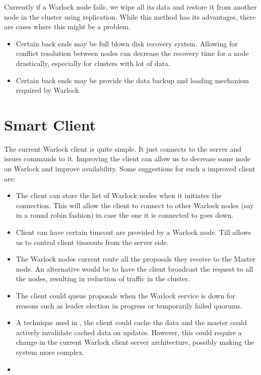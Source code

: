 Currently if a Warlock node fails, we wipe all its data and restore it from
another node in the cluster using replication. While this method has its
advantages, there are cases where this might be a problem.

\begin{itemize}
  \item Certain back ends may be full blown disk recovery system. Allowing for
    conflict resolution between nodes can decrease the recovery time for a
    node drastically, especially for clusters with lot of data.
  \item Certain back ends may be provide the data backup and loading mechanism
    required by Warlock.
\end{itemize}

\section{Smart Client}

The current Warlock client is quite simple. It just connects to the server and
issues commands to it. Improving the client can allow us to decrease some
node on Warlock and improve availability. Some suggestions for such a improved
client are:

\begin{itemize}
  \item The client can store the list of Warlock nodes when it initiates the
    connection. This will allow the client to connect to other Warlock nodes
    (say in a round robin fashion) in case the one it is connected to goes down.
  \item Client can have certain timeout are provided by a Warlock node. Till
    allows us to control client timeouts from the server side.
  \item The Warlock nodes current route all the proposals they receive to the
    Master node. An alternative would be to have the client broadcast the
    request to all the nodes, resulting in reduction of traffic in the cluster.
  \item The client could queue proposals when the Warlock service is down for
    reasons such as leader election in progress or temporarily failed quorums.
  \item A technique used in \citet{Burrows06}, the client could cache the data
    and the master could actively invalidate cached data on updates. However,
    this could require a change in the current Warlock client server
    architecture, possibly making the system more complex.
  \item 
\end{itemize}

